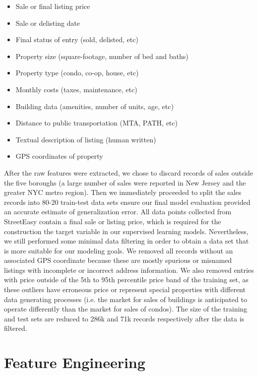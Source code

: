 \documentclass[journal]{IEEEtran}
\begin{document}
\begin{itemize}
    \item Sale or final listing price
    \item Sale or delisting date
    \item Final status of entry (sold, delisted, etc)
    \item Property size (square-footage, number of bed and baths)
    \item Property type (condo, co-op, house, etc)
    \item Monthly costs (taxes, maintenance, etc)
    \item Building data (amenities, number of units, age, etc)
    \item Distance to public transportation (MTA, PATH, etc)
    \item Textual description of listing (human written)
    \item GPS coordinates of property
\end{itemize}

After the raw features were extracted, we chose to discard records of sales outside the five boroughs (a large number of sales were reported in New Jersey and the greater NYC metro region). Then we immediately proceeded to split the sales records into 80-20 train-test data sets ensure our final model evaluation provided an accurate estimate of generalization error. All data points collected from StreetEasy contain a  final sale or listing price, which is required for the construction the target variable in our supervised learning models. Nevertheless, we still performed some minimal data filtering in order to obtain a data set that is more suitable for our modeling goals. We removed all records without an associated GPS coordinate because these are mostly spurious or misnamed listings with incomplete or incorrect address information. We also removed entries with price outside of the 5th to 95th percentile price band of the training set, as these outliers have erroneous price or represent special properties with different data generating processes (i.e. the market for sales of buildings is anticipated to operate differently than the market for sales of condos). The size of the training and test sets are reduced to 286k and 71k records respectively after the data is filtered.

\section{Feature Engineering}
\end{document}
